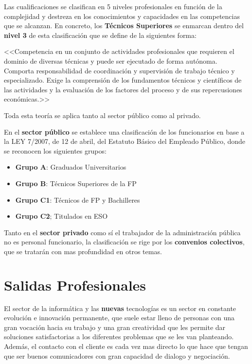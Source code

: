 Las cualificaciones se clasifican en 5 niveles profesionales en función de la complejidad y destreza en los conocimientos y capacidades en las competencias que se alcanzan. En concreto, los \textbf{Técnicos Superiores} se enmarcan dentro del\textbf{ nivel 3} de esta clasificación que se define de la siguientes forma:

<<Competencia en un conjunto de actividades profesionales que requieren el dominio de diversas técnicas y puede ser ejecutado de forma autónoma. Comporta responsabilidad de coordinación y supervisión de trabajo técnico y especializado. Exige la comprensión de los fundamentos técnicos y científicos de las actividades y la evaluación de los factores del proceso y de sus repercusiones económicas.>>

Toda esta teoría se aplica tanto al sector público como al privado.

En el \textbf{sector público} se establece una clasificación de los funcionarios en base a la LEY 7/2007, de 12 de abril, del Estatuto Básico del Empleado Público, donde se reconocen los siguientes grupos:

\begin{itemize}
    \item \textbf{Grupo A}: Graduados Universitarios
    \item \textbf{Grupo B}: Técnicos Superiores de la FP
    \item \textbf{Grupo C1}: Técnicos de FP y Bachilleres
    \item \textbf{Grupo C2}; Titulados en ESO
\end{itemize}

Tanto en el {\bfseries sector privado} como sí el trabajador de la administración pública no es personal funcionario, la clasificación se rige por los \textbf{\gls{convenios colectivos}}, que se tratarán con mas profundidad en otros temas.

\section{Salidas Profesionales}
El sector de la informática y las \textbf{nuevas} tecnologías es un sector en constante evolución e innovación permanente, que suele estar lleno de personas con una gran vocación hacia su trabajo y una gran creatividad que les permite dar soluciones satisfactorias a los diferentes problemas que se les van planteando. Además, el contacto con el cliente es cada vez mas directo lo que hace que tengan que ser buenos comunicadores con gran capacidad de dialogo y negociación.

